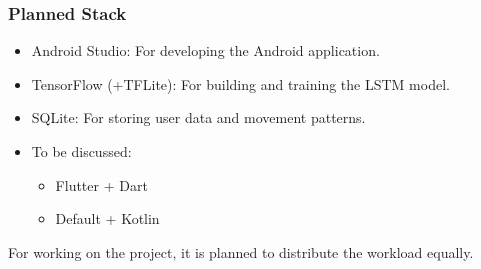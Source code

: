 \documentclass[a4paper,10pt]{article}
\begin{document}
\subsubsection{Planned Stack}
\begin{itemize}
    \item Android Studio: For developing the Android application.
    \item TensorFlow (+TFLite): For building and training the LSTM model.
    \item SQLite: For storing user data and movement patterns.
    \item To be discussed: \begin{itemize}
        \item Flutter + Dart
        \item Default + Kotlin
    \end{itemize}
\end{itemize}

For working on the project, it is planned to distribute the workload equally.



\end{document}
